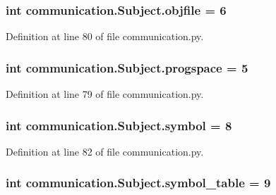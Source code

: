 \subsubsection[{objfile}]{\setlength{\rightskip}{0pt plus 5cm}int communication.\+Subject.\+objfile = 6\hspace{0.3cm}{\ttfamily [static]}}\label{classcommunication_1_1Subject_afc18bbd6bdad22358b66e6a165299ffb}


Definition at line 80 of file communication.\+py.

\hypertarget{classcommunication_1_1Subject_a81b95c05fa8127686bacda56d9f814df}{}
\subsubsection[{progspace}]{\setlength{\rightskip}{0pt plus 5cm}int communication.\+Subject.\+progspace = 5\hspace{0.3cm}{\ttfamily [static]}}\label{classcommunication_1_1Subject_a81b95c05fa8127686bacda56d9f814df}


Definition at line 79 of file communication.\+py.

\hypertarget{classcommunication_1_1Subject_a5a99f69a3182112730b6176bd7dfa21b}{}
\subsubsection[{symbol}]{\setlength{\rightskip}{0pt plus 5cm}int communication.\+Subject.\+symbol = 8\hspace{0.3cm}{\ttfamily [static]}}\label{classcommunication_1_1Subject_a5a99f69a3182112730b6176bd7dfa21b}


Definition at line 82 of file communication.\+py.

\hypertarget{classcommunication_1_1Subject_a2fdd8fb0e4c0f8d02ad11f3094f56480}{}
\subsubsection[{symbol\+\_\+table}]{\setlength{\rightskip}{0pt plus 5cm}int communication.\+Subject.\+symbol\+\_\+table = 9\hspace{0.3cm}{\ttfamily [static]}}\label{classcommunication_1_1Subject_a2fdd8fb0e4c0f8d02ad11f3094f56480}


